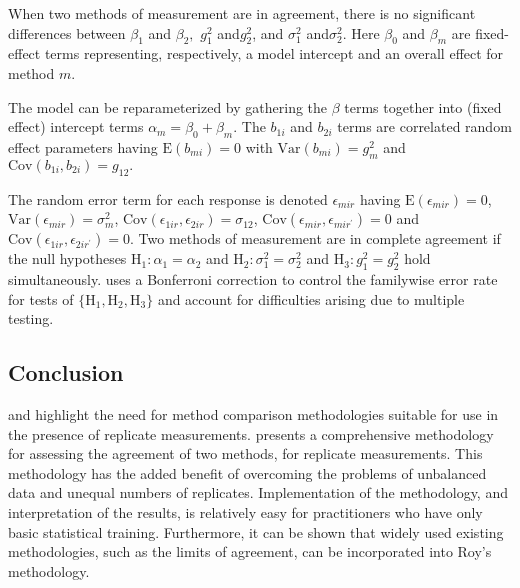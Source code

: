 \documentclass[12pt, a4paper]{report}
\theoremstyle{plain}
\theoremstyle{definition}
\theoremstyle{remark}
\begin{document}
	
	When two methods of measurement are in agreement, there is no significant differences between $\beta_1$ and $\beta_2,$ $g^2_1 $ and$ g^2_2$, and $\sigma^2_1 $ and$ \sigma^2_2$.
	Here $\beta_0$ and $\beta_m$ are fixed-effect terms representing, respectively, a model intercept and an overall effect for method $m.$ 
	
	The model can be reparameterized by gathering the $\beta$ terms together into (fixed effect) intercept terms $\alpha_m=\beta_0+\beta_m.$ The $b_{1i}$ and $b_{2i}$ terms are correlated random effect parameters having $\mathrm{E}(b_{mi})=0$ with $\mathrm{Var}(b_{mi})=g^2_m$ and $\mathrm{Cov}(b_{1i}, b_{2 i})=g_{12}.$ 
	
	The random error term for each response is denoted $\epsilon_{mir}$ having $\mathrm{E}(\epsilon_{mir})=0$, $\mathrm{Var}(\epsilon_{mir})=\sigma^2_m$, $\mathrm{Cov}(\epsilon_{1ir}, \epsilon_{2 ir})=\sigma_{12}$, $\mathrm{Cov}(\epsilon_{mir}, \epsilon_{mir^\prime})= 0$ and $\mathrm{Cov}(\epsilon_{1ir}, \epsilon_{2 ir^\prime})= 0.$ Two methods of measurement are in complete agreement if the null hypotheses $\mathrm{H}_1\colon \alpha_1 = \alpha_2$ and $\mathrm{H}_2\colon \sigma^2_1 = \sigma^2_2 $ and $\mathrm{H}_3\colon g^2_1= g^2_2$ hold simultaneously. \citet{ARoy2009} uses a Bonferroni correction to control the familywise error rate for tests of $\{\mathrm{H}_1, \mathrm{H}_2, \mathrm{H}_3\}$ and account for difficulties arising due to multiple testing. \\
	\bigskip
	
	
	
	
	
	
	
	
	
	




	

	
	
	
	\subsection{Conclusion}
	\citet{BXC2008} and \citet{ARoy2009} highlight the need for method comparison methodologies suitable for use in the presence of replicate measurements. \citet{ARoy2009} presents a comprehensive methodology for assessing the agreement of two methods, for replicate measurements. This methodology has the added benefit of overcoming the problems of unbalanced data and unequal numbers of replicates. Implementation of the methodology, and interpretation of the results, is relatively easy for practitioners who have only basic statistical training. Furthermore, it can be shown that widely used existing methodologies, such as the limits of agreement, can be incorporated into Roy's methodology.
	
\end{document}
